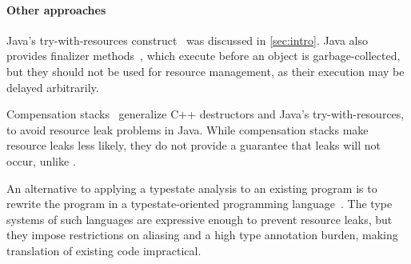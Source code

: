 \paragraph{Other approaches} Java's try-with-resources
construct~\cite{try-with-resources} was discussed in \cref{sec:intro}.  Java
also provides finalizer methods~\cite[Chapter 12]{gosling2014jls}, which execute before an object is
garbage-collected, but they should not be used for resource management, as their
execution may be delayed arbitrarily.

Compensation stacks~\cite{WeimerN04} generalize C++ destructors and Java's
try-with-resources, to avoid resource leak problems in Java.  While
compensation stacks make resource leaks less likely, they do not provide a
guarantee that leaks will not occur, unlike \Tool.

An alternative to applying a typestate analysis to an existing program
is to rewrite the program in a typestate-oriented programming
language~\cite{AldrichSSS2009,garcia2014typestate}.  The type systems of such
languages are expressive enough to prevent resource leaks, but they impose
restrictions on aliasing and a high type annotation burden, making translation
of existing code impractical.






